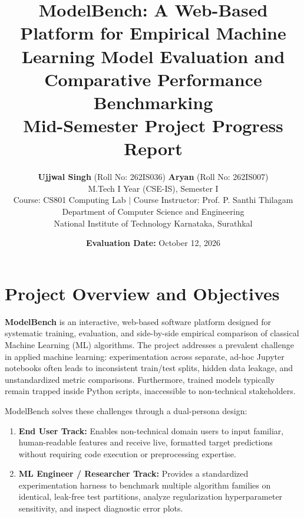 \documentclass[11pt,a4paper]{article}
\begin{document}
\title{\textbf{\Large ModelBench: A Web-Based Platform for Empirical Machine Learning Model Evaluation and Comparative Performance Benchmarking}\\[0.3em]
\large \textbf{Mid-Semester Project Progress Report}}

\author{
    \textbf{Ujjwal Singh} (Roll No: 262IS036) \qquad \textbf{Aryan} (Roll No: 262IS007) \\[0.4em]
    \normalsize M.Tech I Year (CSE-IS), Semester I \\[0.2em]
    \normalsize Course: CS801 Computing Lab $\mid$ Course Instructor: Prof. P. Santhi Thilagam \\[0.2em]
    \normalsize Department of Computer Science and Engineering \\
    \normalsize National Institute of Technology Karnataka, Surathkal
}
\date{\textbf{Evaluation Date:} October 12, 2026}

\maketitle
\thispagestyle{empty}

\vspace{-1.2em}

\section{Project Overview and Objectives}
\label{sec:overview}
\textbf{ModelBench} is an interactive, web-based software platform designed for systematic training, evaluation, and side-by-side empirical comparison of classical Machine Learning (ML) algorithms. The project addresses a prevalent challenge in applied machine learning: experimentation across separate, ad-hoc Jupyter notebooks often leads to inconsistent train/test splits, hidden data leakage, and unstandardized metric comparisons. Furthermore, trained models typically remain trapped inside Python scripts, inaccessible to non-technical stakeholders.

ModelBench solves these challenges through a dual-persona design:
\begin{enumerate}[leftmargin=*,itemsep=1pt,topsep=2pt]
    \item \textbf{End User Track:} Enables non-technical domain users to input familiar, human-readable features and receive live, formatted target predictions without requiring code execution or preprocessing expertise.
    \item \textbf{ML Engineer / Researcher Track:} Provides a standardized experimentation harness to benchmark multiple algorithm families on identical, leak-free test partitions, analyze regularization hyperparameter sensitivity, and inspect diagnostic error plots.
\end{enumerate}
\end{document}

